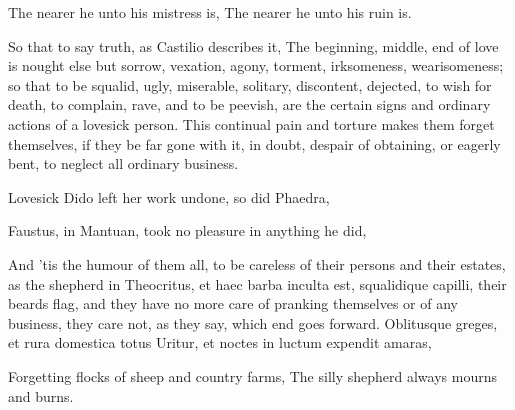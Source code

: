 The nearer he unto his mistress is,
The nearer he unto his ruin is.

So that to say truth, as Castilio describes it, The beginning,
middle, end of love is nought else but sorrow, vexation, agony,
torment, irksomeness, wearisomeness; so that to be squalid, ugly,
miserable, solitary, discontent, dejected, to wish for death, to
complain, rave, and to be peevish, are the certain signs and ordinary
actions of a lovesick person. This continual pain and torture makes
them forget themselves, if they be far gone with it, in doubt, despair
of obtaining, or eagerly bent, to neglect all ordinary business.

Lovesick Dido left her work undone, so did Phaedra,

Faustus, in Mantuan, took no pleasure in anything he did,

And 'tis the humour of them all, to be careless of their persons and
their estates, as the shepherd in Theocritus, et haec barba
inculta est, squalidique capilli, their beards flag, and they have no
more care of pranking themselves or of any business, they care not, as
they say, which end goes forward.
Oblitusque greges, et rura domestica totus
Uritur, et noctes in luctum expendit amaras,

Forgetting flocks of sheep and country farms,
The silly shepherd always mourns and burns.

